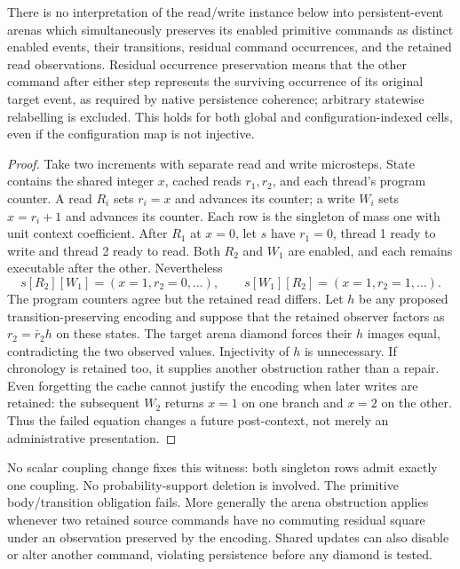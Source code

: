 \documentclass[11pt]{article}
\begin{document}
\begin{proposition}
There is no interpretation of the read/write instance below into persistent-event arenas which simultaneously preserves its enabled primitive commands as distinct enabled events, their transitions, residual command occurrences, and the retained read observations. Residual occurrence preservation means that the other command after either step represents the surviving occurrence of its original target event, as required by native persistence coherence; arbitrary statewise relabelling is excluded. This holds for both global and configuration-indexed cells, even if the configuration map is not injective.
\end{proposition}
\begin{proof}
Take two increments with separate read and write microsteps. State contains the shared integer $x$, cached reads $r_1,r_2$, and each thread's program counter. A read $R_i$ sets $r_i=x$ and advances its counter; a write $W_i$ sets $x=r_i+1$ and advances its counter. Each row is the singleton of mass one with unit context coefficient. After $R_1$ at $x=0$, let $s$ have $r_1=0$, thread 1 ready to write and thread 2 ready to read. Both $R_2$ and $W_1$ are enabled, and each remains executable after the other. Nevertheless
\[
 s[R_2][W_1]=(x=1,r_2=0,\ldots),\qquad
 s[W_1][R_2]=(x=1,r_2=1,\ldots).
\]
The program counters agree but the retained read differs. Let $h$ be any proposed transition-preserving encoding and suppose that the retained observer factors as $r_2=\bar r_2h$ on these states. The target arena diamond forces their $h$ images equal, contradicting the two observed values. Injectivity of $h$ is unnecessary. If chronology is retained too, it supplies another obstruction rather than a repair. Even forgetting the cache cannot justify the encoding when later writes are retained: the subsequent $W_2$ returns $x=1$ on one branch and $x=2$ on the other. Thus the failed equation changes a future post-context, not merely an administrative presentation.
\end{proof}
No scalar coupling change fixes this witness: both singleton rows admit exactly one coupling. No probability-support deletion is involved. The primitive body/transition obligation fails. More generally the arena obstruction applies whenever two retained source commands have no commuting residual square under an observation preserved by the encoding. Shared updates can also disable or alter another command, violating persistence before any diamond is tested.
\end{document}
